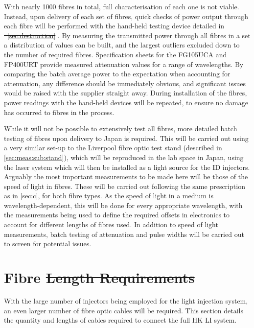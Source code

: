 \documentclass[a4paper,11pt]{article}
\providecommand{\DIFaddtex}[1]{{\protect\color{blue}\uwave{#1}}} %
\providecommand{\DIFdeltex}[1]{{\protect\color{red}\sout{#1}}}                      %
\providecommand{\DIFaddbegin}{} %
\providecommand{\DIFaddend}{} %
\providecommand{\DIFdelbegin}{} %
\providecommand{\DIFdelend}{} %
\providecommand{\DIFadd}[1]{\texorpdfstring{\DIFaddtex{#1}}{#1}} %
\providecommand{\DIFdel}[1]{\texorpdfstring{\DIFdeltex{#1}}{}} %
\newcommand{\DIFscaledelfig}{0.5}
\newlength{\DIFdelgraphicswidth} %
\newlength{\DIFdelgraphicsheight} %
\newcommand{\DIFaddincludegraphics}[2][]{{\color{blue}\fbox{\DIFOincludegraphics[#1]{#2}}}} %
\newcommand{\DIFdelincludegraphics}[2][]{%
\sbox{\DIFdelgraphicsbox}{\DIFOincludegraphics[#1]{#2}}%
\settoboxwidth{\DIFdelgraphicswidth}{\DIFdelgraphicsbox} %
\settoboxtotalheight{\DIFdelgraphicsheight}{\DIFdelgraphicsbox} %
\scalebox{\DIFscaledelfig}{%
\parbox[b]{\DIFdelgraphicswidth}{\usebox{\DIFdelgraphicsbox}\\[-\baselineskip] \rule{\DIFdelgraphicswidth}{0em}}\llap{\resizebox{\DIFdelgraphicswidth}{\DIFdelgraphicsheight}{%
\setlength{\unitlength}{\DIFdelgraphicswidth}%
\begin{picture}(1,1)%
\thicklines\linethickness{2pt} %
{\color[rgb]{1,0,0}\put(0,0){\framebox(1,1){}}}%
{\color[rgb]{1,0,0}\put(0,0){\line( 1,1){1}}}%
{\color[rgb]{1,0,0}\put(0,1){\line(1,-1){1}}}%
\end{picture}%
}\hspace*{3pt}}} %
} %
\DeclareRobustCommand{\DIFaddbegin}{\DIFOaddbegin \let\includegraphics\DIFaddincludegraphics} %
\DeclareRobustCommand{\DIFaddend}{\DIFOaddend \let\includegraphics\DIFOincludegraphics} %
\DeclareRobustCommand{\DIFdelbegin}{\DIFOdelbegin \let\includegraphics\DIFdelincludegraphics} %
\DeclareRobustCommand{\DIFdelend}{\DIFOaddend \let\includegraphics\DIFOincludegraphics} %
\begin{document}
With nearly 1000 fibres in total, full characterisation of each one is not viable. Instead, upon delivery of each set of fibres, quick checks of power output through each fibre will be performed with the hand-held testing device detailed in \DIFdelbegin \DIFdel{\mbox{%
\cref{sec:destruction}}\hskip0pt%
}\DIFdelend \DIFaddbegin \DIFadd{\mbox{%
\cref{sec:tests:sub:destruction}}\hskip0pt%
}\DIFaddend . By measuring the transmitted power through all fibres in a set a distribution of values can be built, and the largest outliers excluded down to the number of required fibres. Specification sheets for the FG105UCA \cite{bib:fg105uca} and FP400URT \cite{bib:fp400urt} provide measured attenuation values for a range of wavelengths. By comparing the batch average power to the expectation when accounting for attenuation, any difference should be immediately obvious, and significant issues would be raised with the supplier straight away. During installation of the fibres, power readings with the hand-held devices will be repeated, to ensure no damage has occurred to fibres in the process.

While it will not be possible to extensively test all fibres, more detailed batch testing of fibres upon delivery to Japan is required. This will be carried out using a very similar set-up to the Liverpool fibre optic test stand (described in \cref{sec:meas:sub:stand}), which will be reproduced in the lab space in Japan, using the laser system which will then be installed as a light source for the ID injectors. Arguably the most important measurements to be made here will be those of the speed of light in fibres. These will be carried out following the same prescription as in \cref{sec:c}, for both fibre types. As the speed of light in a medium is wavelength-dependent, this will be done for every appropriate wavelength, with the measurements being used to define the required offsets in electronics to account for different lengths of fibres used. In addition to speed of light measurements, batch testing of attenuation and pulse widths will be carried out to screen for potential issues.


\section{Fibre \DIFdelbegin \DIFdel{Length Requirements}\DIFdelend \DIFaddbegin \DIFadd{Configurations}\DIFaddend }\label{sec:lengths}

With the large number of injectors being employed for the light injection system, an even larger number of fibre optic cables will be required. This section details the quantity and lengths of cables required to connect the full HK LI system.
\end{document}
